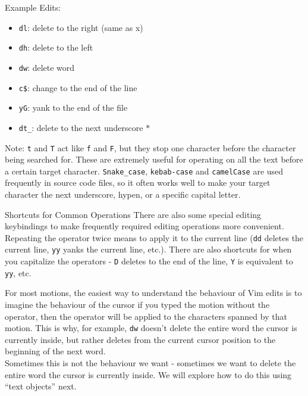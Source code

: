 \documentclass{beamer}
\begin{document}
\begin{frame}[fragile]
    Example Edits:
    \begin{itemize}
	\item \verb+dl+:  delete to the right (same as x)
	\item \verb+dh+:  delete to the left
	\item \verb+dw+:  delete word
	\item \verb+c$+:  change to the end of the line
	\item \verb+yG+:  yank to the end of the file
	\item \verb+dt_+:  delete to the next underscore $\ast$
    \end{itemize}
    Note: \verb+t+ and \verb+T+ act like \verb+f+ and \verb+F+, but they stop one character before the character being searched for. These are extremely useful for operating on all the text before a certain target character. \verb+Snake_case+, \verb+kebab-case+ and \verb+camelCase+ are used frequently in source code files, so it often works well to make your target character the next underscore, hypen, or a specific capital letter.
\end{frame}

\begin{frame}[fragile]
    \begin{block}{Shortcuts for Common Operations}
	There are also some special editing keybindings to make frequently required editing operations more convenient. Repeating the operator twice means to apply it to the current line (\verb+dd+ deletes the current line, \verb+yy+ yanks the current line, etc.). There are also shortcuts for when you capitalize the operators - \verb+D+ deletes to the end of the line, \verb+Y+ is equivalent to \verb+yy+, etc.
    \end{block}
\end{frame}

\begin{frame}[fragile]
    For most motions, the easiest way to understand the behaviour of Vim edits is to imagine the behaviour of the cursor if you typed the motion without the operator, then the operator will be applied to the characters spanned by that motion. This is why, for example, \verb+dw+ doesn't delete the entire word the cursor is currently inside, but rather deletes from the current cursor position to the beginning of the next word.\\
    \vspace{0.5cm}
    Sometimes this is not the behaviour we want - sometimes we want to delete the entire word the cursor is currently inside. We will explore how to do this using \enquote{text objects} next.
\end{frame}
\end{document}
